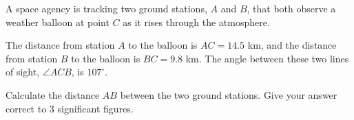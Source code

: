 \begin{question}
\noindent A space agency is tracking two ground stations, $A$ and $B$, that both observe a weather balloon at point $C$ as it rises through the atmosphere.

The distance from station $A$ to the balloon is $AC = 14.5$ km, and the distance from station $B$ to the balloon is $BC = 9.8$ km. The angle between these two lines of sight, $\angle ACB$, is $107^{\circ}$.

\begin{center}
\end{center}

\noindent Calculate the distance $AB$ between the two ground stations.
Give your answer correct to 3 significant figures.

\vspace{5cm}

\begin{flushright}
\end{flushright}
\end{question}